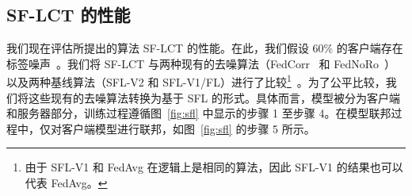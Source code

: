 \begin{table}[t]
\centering

\caption{Average of The Best Accuracies of Various Algorithms with Non-IID Setting (Class Dependent)}
\label{table:compare instance dependent}
\end{table}

\subsection{SF-LCT 的性能}\label{sec: comparison}

我们现在评估所提出的算法 SF-LCT 的性能。在此，我们假设 60\% 的客户端存在标签噪声~\cite{b9,ji2024fedfixer,li2024feddiv}。我们将 SF-LCT 与两种现有的去噪算法（FedCorr~\cite{b9} 和 FedNoRo~\cite{wu2023fednoro}）以及两种基线算法（SFL-V2 和 SFL-V1/FL）进行了比较\footnote{由于 SFL-V1 和 FedAvg 在逻辑上是相同的算法，因此 SFL-V1 的结果也可以代表 FedAvg。}~\cite{thapa2022splitfed}。为了公平比较，我们将这些现有的去噪算法转换为基于 SFL 的形式。具体而言，模型被分为客户端和服务器部分，训练过程遵循图~\ref{fig:sfl} 中显示的步骤 1 至步骤 4。在模型联邦过程中，仅对客户端模型进行联邦，如图~\ref{fig:sfl} 的步骤 5 所示。

